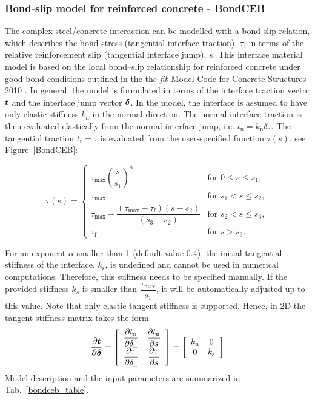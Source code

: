 \documentclass[a4paper]{article}
\newcommand{\mbf}[1]{\mbox{\boldmath$#1$}}
\begin{document}
\subsubsection{Bond-slip model for reinforced concrete - BondCEB}
The complex steel/concrete interaction can be modelled with a bond-slip relation, which describes the bond stress (tangential interface traction), $\tau$, in terms of the relative reinforcement slip (tangential interface jump), $s$. This interface material model is based on the local bond--slip relationship for reinforced concrete under good bond conditions outlined in the the \textit{fib} Model Code for Concrete Structures 2010 \cite{fib:2010}.
In general, the model is formulated in terms of the interface traction vector $\mbf{t}$ and the interface jump vector $\mbf{\delta}$. 
In the model, the interface is assumed to have only elastic stiffness $k_{\text{n}}$ in the normal direction. The normal interface traction is then evaluated elastically from the normal interface jump, i.e. $t_{\text{n}} =  k_{\text{n}} \delta_{\text{n}}$. The tangential traction $t_{\text{t}} = \tau$ is evaluated from the user-specified function $\tau (s)$, see Figure~\ref{BondCEB}:

\begin{equation}
\tau (s) = \begin{cases}
	\tau_\text{max} \left( \dfrac{s}{s_1} \right) ^ \alpha & \text{for } 0 \leq s \leq s_1, \\
	\tau_\text{max} & \text{for } s_1 < s \leq s_2, \\
	\tau_\text{max} - \dfrac{\left( \tau_\text{max} - \tau_\text{f} \right) \left(s-s_2 \right)}{\left( s_3 - s_2 \right)} & \text{for } s_2 < s \leq s_3, \\
	\tau_\text{f} & \text{for } s > s_3.
	\end{cases}
\end{equation}

\noindent For an exponent $\alpha$ smaller than 1 (default value 0.4), the initial tangential stiffness of the interface, $k_{\text{s}}$, is undefined and cannot be used in numerical computations. Therefore, this stiffness needs to be specified manually. If the provided stiffness $k_s$ is smaller than $\dfrac{\tau_\text{max}}{s_1}$, it will be automatically adjusted up to this value. Note that only elastic tangent stiffness is supported. Hence, in 2D the tangent stiffness matrix takes the form
\begin{equation}
\dfrac{\partial \mbf{t}}{\partial \mbf{\delta}}= \left[ \begin{array}{cc}
\dfrac{\partial t_\text{n}}{\partial \delta_\text{n}} &
\dfrac{\partial t_\text{n}}{\partial s} \\
\dfrac{\partial \tau}{\partial \delta_\text{n}} & \dfrac{\partial \tau}{\partial s}
\end{array} \right] =
\left[ \begin{array}{cc}
k_\text{n} & 0 \\ 0 & k_\text{s}
\end{array} \right]
\end{equation}
Model description and the input parameters are summarized in Tab.~\ref{bondceb_table}.
\end{document}

